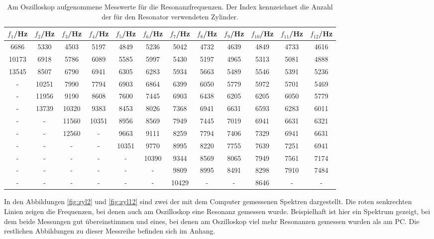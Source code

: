 \begin{table}[h!]
	\begin{center}
    \caption{Am Oszilloskop aufgenommene Messwerte für die Resonanzfrequenzen. Der
    Index kennzeichnet die Anzahl der für den Resonator verwendeten Zylinder.}
    \label{tab:oszi}
    \tiny
		\begin{tabular}{cccccccccccc}
		\toprule
			{$f_1$/Hz} & {$f_2$/Hz} & {$f_3$/Hz} & {$f_4$/Hz} & {$f_5$/Hz} & {$f_6$/Hz} & {$f_7$/Hz} & {$f_8$/Hz} & {$f_9$/Hz} & {$f_{10}$/Hz} & {$f_{11}$/Hz} & {$f_{12}$/Hz}\\
			\midrule
			6686 & 5330 & 4503 & 5197 & 4849 & 5236 & 5042 & 4732 & 4639 & 4849 & 4733 & 4616\\
			10173 & 6918 & 5786 & 6089 & 5585 & 5997 & 5430 & 5197 & 4965 & 5313 & 5081 & 4888\\
			13545 & 8507 & 6790 & 6941 & 6305 & 6283 & 5934 & 5663 & 5489 & 5546 & 5391 & 5236\\
			{-} & 10251 & 7990 & 7794 & 6903 & 6864 & 6399 & 6050 & 5779 & 5972 & 5701 & 5469\\
			{-} & 11956 & 9190 & 8608 & 7600 & 7445 & 6903 & 6438 & 6205 & 6205 & 6050 & 5779\\
			{-} & 13739 & 10320 & 9383 & 8453 & 8026 & 7368 & 6941 & 6631 & 6593 & 6283 & 6011\\
			{-} & {-} & 11560 & 10351 & 8956 & 8569 & 7949 & 7445 & 7019 & 6941 & 6631 & 6321\\
			{-} & {-} & 12560 & {-} & 9663 & 9111 & 8259 & 7794 & 7406 & 7329 & 6941 & 6631\\
			{-} & {-} & {-} & {-} & 10351 & 9770 & 8995 & 8220 & 7755 & 7639 & 7251 & 6941\\
			{-} & {-} & {-} & {-} & {-} & 10390 & 9344 & 8569 & 8065 & 7949 & 7561 & 7174\\
			{-} & {-} & {-} & {-} & {-} & {-} & 9809 & 8995 & 8491 & 8298 & 7910 & 7484\\
			{-} & {-} & {-} & {-} & {-} & {-} & 10429 & {-} & {-} & 8646 & {-} & {-}\\
		\bottomrule
		\end{tabular}
	\end{center}
\end{table}

In den Abbildungen \ref{fig:zyl2} und \ref{fig:zyl12} sind zwei der mit dem Computer gemessenen
Spektren dargestellt. Die roten senkrechten Linien zeigen die Frequenzen, bei denen
auch am Oszilloskop eine Resonanz gemessen wurde. Beispielhaft ist hier ein Spektrum
gezeigt, bei dem beide Messungen gut übereinstimmen und eines, bei denen am Oszilloskop
viel mehr Resonanzen gemessen wurden als am PC. Die restlichen Abbildungen zu dieser
Messreihe befinden sich im Anhang.

